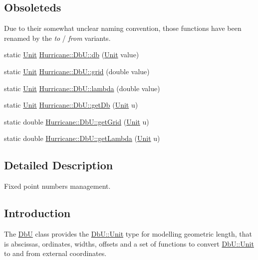 \subsection*{Obsoleteds}
\label{_amgrpf05125b8b6a468721054b36b1a1cfd62}%
 Due to their somewhat unclear naming convention, those functions have been renamed by the {\itshape to} / {\itshape from} variants. \begin{DoxyCompactItemize}
\item 
static \hyperlink{group__DbUGroup_ga4fbfa3e8c89347af76c9628ea06c4146}{Unit} \hyperlink{group__DbUGroup_gacd77957381fb93fc4203bdca215e0b48}{Hurricane\+::\+Db\+U\+::db} (\hyperlink{group__DbUGroup_ga4fbfa3e8c89347af76c9628ea06c4146}{Unit} value)
\item 
static \hyperlink{group__DbUGroup_ga4fbfa3e8c89347af76c9628ea06c4146}{Unit} \hyperlink{group__DbUGroup_ga1d4bac6e3b68c8cd44b345de3b425753}{Hurricane\+::\+Db\+U\+::grid} (double value)
\item 
static \hyperlink{group__DbUGroup_ga4fbfa3e8c89347af76c9628ea06c4146}{Unit} \hyperlink{group__DbUGroup_gaa1ba98acc939ff1c370c18544a5e0dce}{Hurricane\+::\+Db\+U\+::lambda} (double value)
\item 
static \hyperlink{group__DbUGroup_ga4fbfa3e8c89347af76c9628ea06c4146}{Unit} \hyperlink{group__DbUGroup_ga4233772b1b3e68f3ec723c7509ea87ff}{Hurricane\+::\+Db\+U\+::get\+Db} (\hyperlink{group__DbUGroup_ga4fbfa3e8c89347af76c9628ea06c4146}{Unit} u)
\item 
static double \hyperlink{group__DbUGroup_gad4485d0d7b5fd7ae87b32f165155c0a2}{Hurricane\+::\+Db\+U\+::get\+Grid} (\hyperlink{group__DbUGroup_ga4fbfa3e8c89347af76c9628ea06c4146}{Unit} u)
\item 
static double \hyperlink{group__DbUGroup_gadea6b9a6e84243f70f3a5e2725b2c6d8}{Hurricane\+::\+Db\+U\+::get\+Lambda} (\hyperlink{group__DbUGroup_ga4fbfa3e8c89347af76c9628ea06c4146}{Unit} u)
\end{DoxyCompactItemize}


\subsection{Detailed Description}
Fixed point numbers management. 

\hypertarget{group__DbUGroup_secDbUIntro}{}\subsection{Introduction}\label{group__DbUGroup_secDbUIntro}
The \hyperlink{classHurricane_1_1DbU}{DbU} class provides the \hyperlink{group__DbUGroup_ga4fbfa3e8c89347af76c9628ea06c4146}{Db\+U\+::\+Unit} type for modelling geometric length, that is abscissas, ordinates, widths, offsets and a set of functions to convert \hyperlink{group__DbUGroup_ga4fbfa3e8c89347af76c9628ea06c4146}{Db\+U\+::\+Unit} to and from external coordinates.

